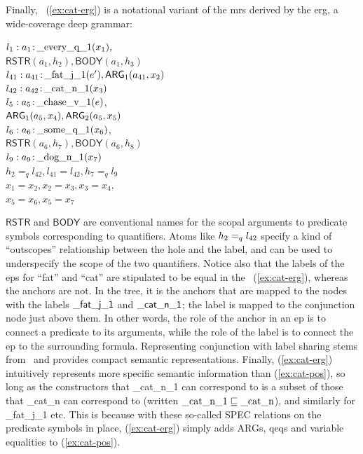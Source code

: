 Finally, \rmrs\ (\ref{ex:cat-erg}) is a notational variant of the {\sc
  mrs} derived by the {\sc erg}, a wide-coverage deep grammar:
\begin{examples}
\item $l_1:a_1\colon\!\mathrm{\_every\_q\_1}(x_1),$\\
\hspace*{0.1in}$\mathsf{RSTR}(a_1,h_2),
\mathsf{BODY}(a_1,h_3)$\\ 
$l_{41}:a_{41}\colon\!\mathrm{\_fat\_j\_1}(e'), \mathsf{ARG}_1(a_{41},x_2)$\\
$l_{42}:a_{42}\colon\!\mathrm{\_cat\_n\_1}(x_3)$\\
$l_5:a_5\colon\!\mathrm{\_chase\_v\_1}(e)$,\\
\hspace*{0.1in}$\mathsf{ARG}_1(a_5,x_4),
\mathsf{ARG}_2(a_5,x_5)$\\ 
$l_6:a_6\colon\!\mathrm{\_some\_q\_1}(x_6)$,\\
\hspace*{0.1in}$\mathsf{RSTR}(a_6,h_7),
\mathsf{BODY}(a_6,h_8)$\\ 
$l_9:a_9\colon\!\mathrm{\_dog\_n\_1}(x_7)$\\
$h_2=_q l_{42}, l_{41}=l_{42}, h_7 =_q l_9$\\
$x_1=x_2, x_2=x_3, x_3=x_4,$\\
$x_5=x_6, x_5=x_7$
\label{ex:cat-erg}
\end{examples}
$\mathsf{RSTR}$ and $\mathsf{BODY}$ are conventional names for the
scopal arguments to predicate symbols corresponding to quantifiers.
Atoms like $h_2 =_q l_{42}$ specify a kind of ``outscopes''
relationship between the hole and the label, and can be used to
underspecify the scope of the two quantifiers.  Notice also that the
labels of the {\sc ep}s for ``fat'' and ``cat'' are stipulated to be
equal in the \rmrs\ (\ref{ex:cat-erg}), whereas the anchors are not.
In the tree, it is the anchors that are mapped to the nodes with the
labels $\mathsf{\_fat\_j\_1}$ and $\mathsf{\_cat\_n\_1}$; the label is
mapped to the conjunction node just above them.  In other words, the
role of the anchor in an {\sc ep} is to connect a predicate to its
arguments, while the role of the label is to connect the {\sc ep} to
the surrounding formula.  Representing conjunction with label sharing
stems from \mrs\ and provides compact semantic representations.
Finally, (\ref{ex:cat-erg}) intuitively represents more specific
semantic information than (\ref{ex:cat-pos}), so long as the
constructors that \_cat\_n\_1 can correspond to is a subset of those
that \_cat\_n can correspond to (written
$\mathrm{\_cat\_n\_1}\sqsubseteq \mathrm{\_cat\_n}$), and similarly
for \_fat\_j\_1 etc.  This is because with these so-called SPEC
relations on the predicate symbols in place, (\ref{ex:cat-erg}) simply
adds ARGs, qeqs and variable equalities to (\ref{ex:cat-pos}).

